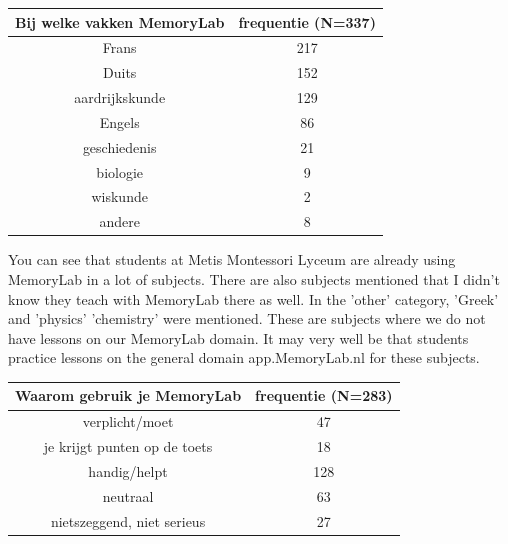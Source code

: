\documentclass[12pt, a4paper]{article}
\begin{document}
{{\begin{center}
    \begin{tabular}{|c|c|}
    \hline
         Bij welke vakken MemoryLab & frequentie (N=337) \\
     \hline
     Frans & 217 \\ 
     Duits & 152  \\ 
     aardrijkskunde & 129 \\
     Engels & 86  \\ 
     geschiedenis & 21 \\
     biologie & 9 \\
     wiskunde & 2 \\
     andere & 8 \\
     \hline
    \end{tabular}
    \end{center}
You can see that students at Metis Montessori Lyceum are already using MemoryLab in a lot of subjects. There are also subjects mentioned that I didn't know they teach with MemoryLab there as well. In the 'other' category, 'Greek' and 'physics' 'chemistry' were mentioned. These are subjects where we do not have lessons on our MemoryLab domain. It may very well be that students practice lessons on the general domain app.MemoryLab.nl for these subjects.

\begin{center}
    \begin{tabular}{|c|c|} 
    \hline
         Waarom gebruik je MemoryLab & frequentie (N=283) \\
     \hline
        verplicht/moet & 47 \\
        je krijgt punten op de toets & 18 \\
        handig/helpt & 128 \\
        neutraal & 63 \\
        nietszeggend, niet serieus & 27 \\
     \hline
    \end{tabular}
    \end{center}

}}
\end{document}
